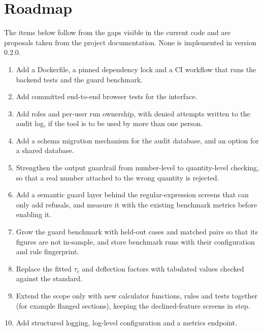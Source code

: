 \chapter{Roadmap}\label{ch:road}

The items below follow from the gaps visible in the current code and are proposals taken from the project documentation. None is implemented in version 0.2.0.
\begin{enumerate}
  \item Add a Dockerfile, a pinned dependency lock and a CI workflow that runs the backend tests and the guard benchmark.
  \item Add committed end-to-end browser tests for the interface.
  \item Add roles and per-user run ownership, with denied attempts written to the audit log, if the tool is to be used by more than one person.
  \item Add a schema migration mechanism for the audit database, and an option for a shared database.
  \item Strengthen the output guardrail from number-level to quantity-level checking, so that a real number attached to the wrong quantity is rejected.
  \item Add a semantic guard layer behind the regular-expression screens that can only add refusals, and measure it with the existing benchmark metrics before enabling it.
  \item Grow the guard benchmark with held-out cases and matched pairs so that its figures are not in-sample, and store benchmark runs with their configuration and rule fingerprint.
  \item Replace the fitted $\tau_c$ and deflection factors with tabulated values checked against the standard.
  \item Extend the scope only with new calculator functions, rules and tests together (for example flanged sections), keeping the declined-feature screens in step.
  \item Add structured logging, log-level configuration and a metrics endpoint.
\end{enumerate}
